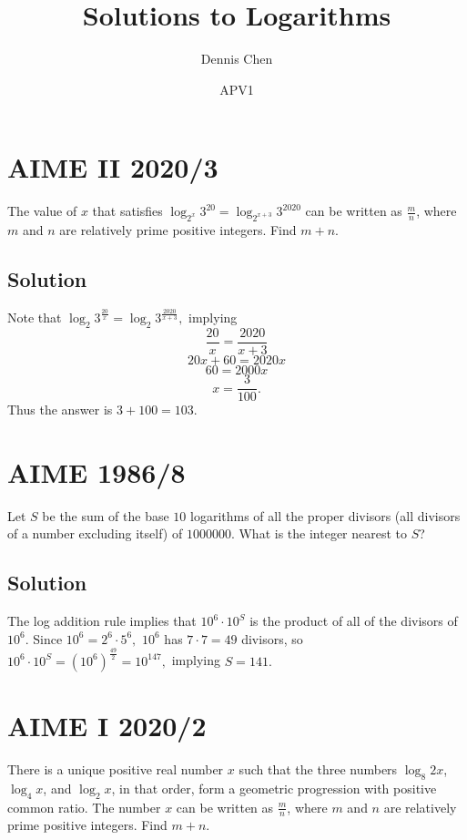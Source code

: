 \documentclass{article}
\title{Solutions to Logarithms}
\author{Dennis Chen}
\date{APV1}
\begin{document}
\maketitle

\toc

\pagebreak\section{AIME II 2020/3}

The value of $x$ that satisfies $\log_{2^x} 3^{20} = \log_{2^{x+3}} 3^{2020}$ can be written as $\frac{m}{n}$, where $m$ and $n$ are relatively prime positive integers. Find $m+n$.

\subsection{Solution}

Note that $\log_2{3}^\frac{20}{x}=\log_2{3}^\frac{2020}{x+3},$ implying
\[\frac{20}{x}=\frac{2020}{x+3}\]
\[20x+60=2020x\]
\[60=2000x\]
\[x=\frac{3}{100}.\]
Thus the answer is $3+100=103.$

\pagebreak\section{AIME 1986/8}

Let $S$ be the sum of the base $10$ logarithms of all the proper divisors (all divisors of a number excluding itself) of $1000000$. What is the integer nearest to $S$?

\subsection{Solution}

The log addition rule implies that $10^6\cdot 10^S$ is the product of all of the divisors of $10^6.$ Since $10^6=2^6\cdot 5^6,$ $10^6$ has $7\cdot 7=49$ divisors, so $10^6\cdot 10^S=(10^6)^{\frac{49}{2}}=10^{147},$ implying $S=141.$

\pagebreak\section{AIME I 2020/2}

There is a unique positive real number $x$ such that the three numbers $\log_8{2x}$, $\log_4{x}$, and $\log_2{x}$, in that order, form a geometric progression with positive common ratio. The number $x$ can be written as $\frac{m}{n}$, where $m$ and $n$ are relatively prime positive integers. Find $m + n$.
\end{document}
